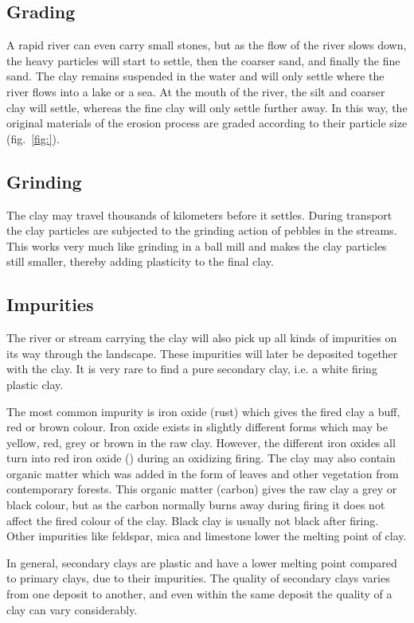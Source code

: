 \subsection{Grading}
A rapid river can even carry small stones, but as the flow of the river slows 
down, the heavy particles will start to settle, then the coarser sand, and 
finally the fine sand. The clay remains suspended in the water and will only 
settle where the river flows into a lake or a sea. At the mouth of the river, 
the silt and coarser clay will settle, whereas the fine clay will only settle 
further away. In this way, the original materials of the erosion process are 
graded according to their particle size (fig.~\ref{fig:}).
\subsection{Grinding}
The clay may travel thousands of kilometers before it settles. During transport 
the clay particles are subjected to the grinding action of pebbles in the 
streams. This works very much like grinding in a ball mill and makes the clay 
particles still smaller, thereby adding plasticity to the final clay.
\subsection{Impurities}
The river or stream carrying the clay will also pick up all kinds of impurities 
on its way through the landscape. These impurities will later be deposited 
together with the clay. It is very rare to find a pure secondary clay, i.e. a 
white firing plastic clay.

The most common impurity is iron oxide (rust) which gives the fired clay a 
buff, red or brown colour. Iron oxide exists in slightly different forms which 
may be yellow, red, grey or brown in the raw clay. However, the different iron 
oxides all turn into red iron oxide () during an oxidizing firing. 
The clay may also contain organic matter which was added in the form of leaves 
and other vegetation from contemporary forests. This organic matter (carbon) 
gives the raw clay a grey or black colour, but as the carbon normally burns 
away during firing it does not affect the fired colour of the clay. Black clay 
is usually not black after firing. Other impurities like feldspar, mica and 
limestone lower the melting point of clay.

In general, secondary clays are plastic and have a lower melting point compared 
to primary clays, due to their impurities. The quality of secondary clays 
varies from one deposit to another, and even within the same deposit the 
quality of a clay can vary considerably.
